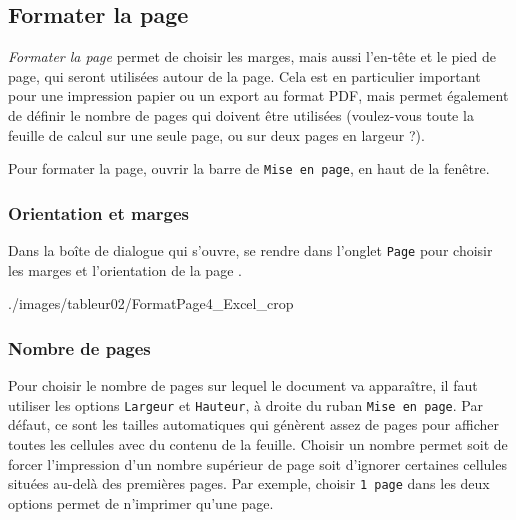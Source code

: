 


\subsection{Formater la page}\label{Calc2FormaterPage} 

\emph{Formater la page} permet de choisir les marges, mais aussi l'en-tête et le pied de page, qui seront utilisées autour de la page. Cela est en particulier important pour une impression papier ou un export au format PDF, mais permet également de définir le nombre de pages qui doivent être utilisées (voulez-vous toute la feuille de calcul sur une seule page, ou sur deux pages en largeur ?).

\vspace{12pt}

Pour formater la page, ouvrir la barre de \texttt{Mise en page}, en haut de la fenêtre. 




\subsubsection{Orientation et marges}  

Dans la boîte de dialogue qui s'ouvre, se rendre dans l'onglet \texttt{Page} pour choisir les marges  et l'orientation de la page .

%
                {./images/tableur02/FormatPage4_Excel_crop}{\textwidth}  


\subsubsection{Nombre de pages}

Pour choisir le nombre de pages sur lequel le document va apparaître, il faut utiliser les options \texttt{Largeur} et \texttt{Hauteur}, à droite du ruban \texttt{Mise en page}. Par défaut, ce sont les tailles automatiques qui génèrent assez de pages pour afficher toutes les cellules avec du contenu de la feuille. Choisir un nombre permet soit de forcer l'impression d'un nombre supérieur de page soit d'ignorer certaines cellules situées au-delà des premières pages. Par exemple, choisir \texttt{1 page} dans les deux options permet de n'imprimer qu'une page.

